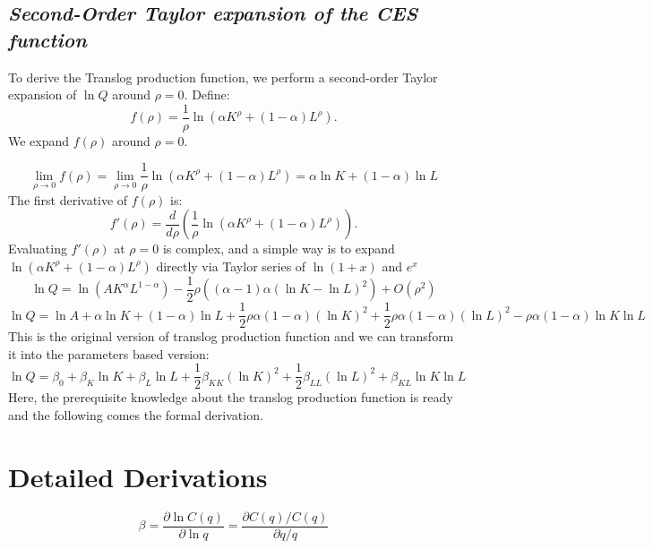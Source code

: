\documentclass{article}
\begin{document}
\subsection*{\textit{Second-Order Taylor expansion of the CES function}}
To derive the Translog production function, we perform a second-order Taylor expansion of \( \ln Q \) around \( \rho = 0 \). Define:
\[
f(\rho) = \frac{1}{\rho} \ln \left( \alpha K^\rho + (1 - \alpha) L^\rho \right).
\]
We expand \( f(\rho) \) around \( \rho = 0 \).\par
\[
\lim_{\rho \to 0}f(\rho) = \lim_{\rho \to 0} \frac{1}{\rho}  \ln \left( \alpha K^{\rho} + (1 - \alpha) L^{\rho} \right) =  \alpha \ln{K} + (1 - \alpha) \ln{L} 
\]
The first derivative of \( f(\rho) \) is:
\[
f'(\rho) = \frac{d}{d\rho} \left( \frac{1}{\rho} \ln \left( \alpha K^\rho + (1 - \alpha) L^\rho \right) \right).
\]
Evaluating \( f'(\rho) \) at \( \rho = 0 \) is complex, and a simple way is to expand $\ln \left( \alpha K^\rho + (1 - \alpha) L^\rho \right) $ directly via Taylor series of $\ln\left( 1+x \right)$ and $e^{x}$
\[
\ln Q = \ln \left(A K^{\alpha } L^{1-\alpha }\right)-\frac{1}{2} \rho  \left((\alpha -1) \alpha  (\ln K-\ln L)^2\right)+O\left(\rho ^2\right)
\]
\[
\ln Q=\ln{A} + \alpha \ln{K}+(1-\alpha) \ln{L} + \frac{1}{2}\rho \alpha (1-\alpha) (\ln K)^2+ \frac{1}{2}\rho \alpha (1-\alpha) (\ln L)^2 - \rho \alpha (1-\alpha)\ln K \ln L
\]
This is the original version of translog production function and we can transform it into the parameters based version:
\[
\ln Q = \beta_0 + \beta_K \ln K + \beta_L \ln L + \frac{1}{2} \beta_{KK} (\ln K)^2 + \frac{1}{2} \beta_{LL} (\ln L)^2 + \beta_{KL} \ln K \ln L
\]
Here, the prerequisite knowledge about the translog production function is ready and the following comes the formal derivation.

\section*{Detailed Derivations}

\begin{equation}
    \beta=\frac{\partial \ln C(q)}{\partial \ln q}=\frac{\partial C(q) / C(q)}{\partial q / q}
\label{eq: cost response to sales change}
\end{equation}
\end{document}
